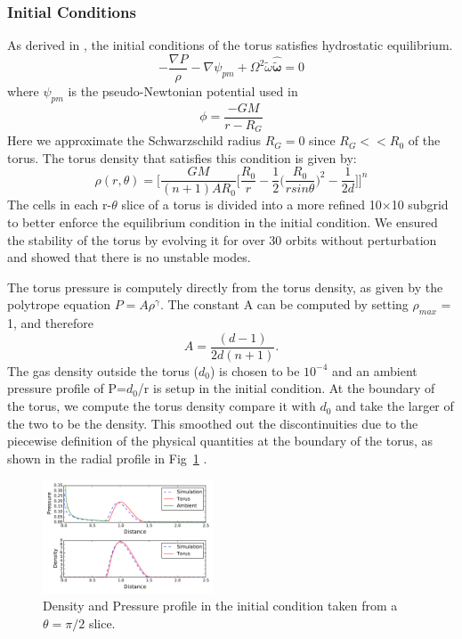 \documentclass[iop,revtex4]{emulateapj}
\begin{document}
\subsubsection{Initial Conditions\label{sec:IC}}
\par As derived in \cite{Papaloizou:1984A}, the initial conditions of the torus satisfies hydrostatic equilibrium.
\begin{equation}
-\frac{\nabla P}{\rho}-\nabla \psi_{pm} +\Omega^2\tilde{\omega}\mathbf{\hat{\tilde{\omega}}}=0
\end{equation}
where $\psi_{pm}$ is the pseudo-Newtonian potential used in \cite{Blaes:1987A}
\begin{equation}
\phi = \frac{-GM}{r-R_G}
\end{equation}
 Here we approximate the Schwarzschild radius $R_G=0$ since $R_G <<R_0$ of the torus. The torus density that satisfies this condition is given by: 
\begin{equation}
\rho(r,\theta) = \Bigg[\frac{GM}{(n+1)AR_0}\Big[\frac{R_0}{r}-\frac{1}{2}\Bigg(\frac{R_0}{r sin\theta}\Bigg)^2-\frac{1}{2d}\Big]\Bigg]^n
\end{equation}
The cells in each r-$\theta$ slice of a torus is divided into a more refined 10$\times$10 subgrid to better enforce the equilibrium condition in the initial condition. We ensured the stability of the torus by evolving it for over 30 orbits without perturbation and showed that there is no unstable modes. 
\par The torus pressure is computely directly from the torus density, as given by the polytrope equation $P = A\rho^\gamma$.  The constant A can be computed by setting $\rho_{max}$ = 1, and therefore $$A =\frac{(d-1)}{2d(n+1)}.$$
The gas density outside the torus ($d_0$) is chosen to be $10^{-4}$ and an ambient pressure profile of P=$d_0$/r is setup in the initial condition. At the boundary of the torus, we compute the torus density compare it with $d_0$ and take the larger of the two to be the density. This smoothed out the discontinuities due to the piecewise definition of the physical quantities at the boundary of the torus, as shown in the radial profile in Fig~\ref{d_p_profile} .
\begin{figure}
\includegraphics[width=0.45\textwidth]{plots/profile.pdf}
\caption{Density and Pressure profile in the initial condition taken from a $\theta = \pi/2$ slice.}
\label{d_p_profile}
\end{figure}
\end{document}
